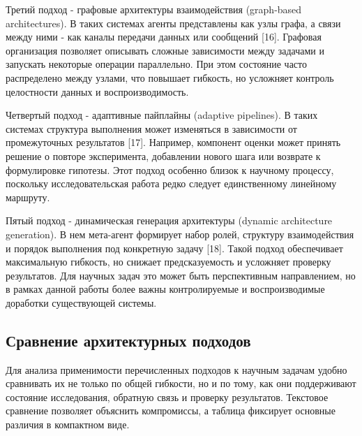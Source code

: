 Третий подход - графовые архитектуры взаимодействия (graph-based architectures). В таких системах агенты представлены как узлы графа, а связи между ними - как каналы передачи данных или сообщений [16]. Графовая организация позволяет описывать сложные зависимости между задачами и запускать некоторые операции параллельно. При этом состояние часто распределено между узлами, что повышает гибкость, но усложняет контроль целостности данных и воспроизводимость.

Четвертый подход - адаптивные пайплайны (adaptive pipelines). В таких системах структура выполнения может изменяться в зависимости от промежуточных результатов [17]. Например, компонент оценки может принять решение о повторе эксперимента, добавлении нового шага или возврате к формулировке гипотезы. Этот подход особенно близок к научному процессу, поскольку исследовательская работа редко следует единственному линейному маршруту. 

Пятый подход - динамическая генерация архитектуры (dynamic architecture generation). В нем мета-агент формирует набор ролей, структуру взаимодействия и порядок выполнения под конкретную задачу [18]. Такой подход обеспечивает максимальную гибкость, но снижает предсказуемость и усложняет проверку результатов. Для научных задач это может быть перспективным направлением, но в рамках данной работы более важны контролируемые и воспроизводимые доработки существующей системы.

\subsection{Сравнение архитектурных подходов}

Для анализа применимости перечисленных подходов к научным задачам удобно сравнивать их не только по общей гибкости, но и по тому, как они поддерживают состояние исследования, обратную связь и проверку результатов. Текстовое сравнение позволяет объяснить компромиссы, а таблица фиксирует основные различия в компактном виде.

